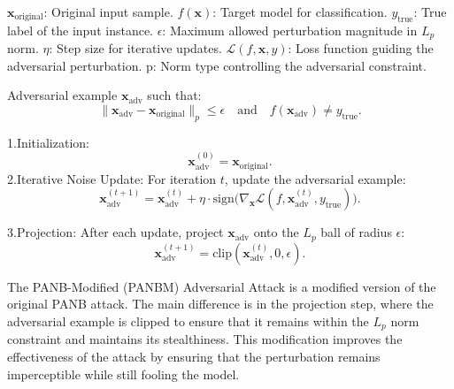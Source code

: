 $\mathbf{x}_{\text{original}}$: Original input sample.  
$f(\mathbf{x})$: Target model for classification.  
$y_{\text{true}}$: True label of the input instance.  
$\epsilon$: Maximum allowed perturbation magnitude in $L_p$ norm.  
$\eta$: Step size for iterative updates.  
$\mathcal{L}(f, \mathbf{x}, y)$: Loss function guiding the adversarial perturbation.  
p: Norm type controlling the adversarial constraint.


Adversarial example $\mathbf{x}_{\text{adv}}$ such that:
  \[
  \|\mathbf{x}_{\text{adv}} - \mathbf{x}_{\text{original}}\|_p \leq \epsilon \quad \text{and} \quad f(\mathbf{x}_{\text{adv}}) \neq y_{\text{true}}.
  \]

1.Initialization:
   \[
   \mathbf{x}_{\text{adv}}^{(0)} = \mathbf{x}_{\text{original}}.
   \]
2.Iterative Noise Update:
   For iteration $t$, update the adversarial example:
   \[
   \mathbf{x}_{\text{adv}}^{(t+1)} = \mathbf{x}_{\text{adv}}^{(t)} + \eta \cdot \text{sign}\big(\nabla_{\mathbf{x}} \mathcal{L}(f, \mathbf{x}_{\text{adv}}^{(t)}, y_{\text{true}})\big).
   \]

3.Projection:
   After each update, project $\mathbf{x}_{\text{adv}}$ onto the $L_p$ ball of radius $\epsilon$:
   \[
   \mathbf{x}_{\text{adv}}^{(t+1)} = \text{clip}(\mathbf{x}_{\text{adv}}^{(t)}, 0, \epsilon).
   \]

The PANB-Modified (PANBM) Adversarial Attack is a modified version of the original PANB attack. The main difference is in the projection step, where the adversarial example is clipped to ensure that it remains within the $L_p$ norm constraint and maintains its stealthiness. This modification improves the effectiveness of the attack by ensuring that the perturbation remains imperceptible while still fooling the model.